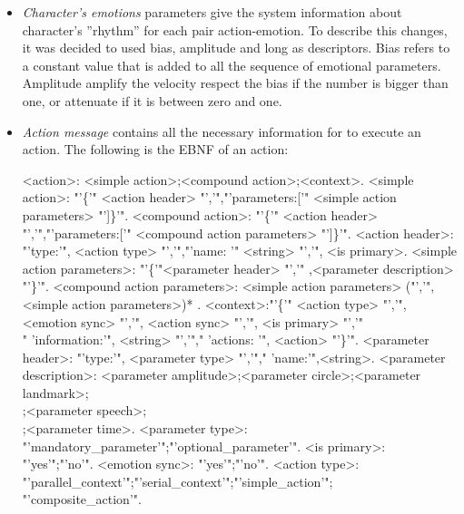 \begin{itemize}
	\item \textit{Character's emotions} parameters give the system information about character's ''rhythm'' for each pair action-emotion. To describe this changes, it was decided to used bias, amplitude and long as descriptors. Bias refers to a constant value that is added to all the sequence of emotional parameters. Amplitude amplify the velocity respect the bias if the number is bigger than one, or attenuate if it is between zero and one. 


	\item \textit{Action message} contains all the necessary information for to execute an action. The following is the EBNF of an action:
\begin{grammar}
<action>: <simple action>;<compound action>;<context>.
<simple action>: "'\{'" <action header> "','","'parameters:['" <simple action parameters> "']\}'".
<compound action>: "'\{'" <action header> "','","'parameters:['" <compound action parameters> "']\}'".
<action header>: "'type:'", <action type> "','","'name: '" <string>  "','", <is primary>.
<simple action parameters>: "'\{'"<parameter header> "','" ,<parameter description> "'\}'". 
<compound action parameters>:  <simple action parameters> ("','", <simple action parameters>)* .
<context>:"'\{'" <action type> "','", <emotion sync> "','", <action sync> "','", <is primary> "','"\\" 'information:'", <string> "','"," 'actions: '", <action> "'\}'".
<parameter header>: "'type:'", <parameter type> "','"," 'name:'",<string>.
<parameter description>: <parameter amplitude>;<parameter circle>;<parameter landmark>;\\<parameter point>;<parameter speech>;\\<parameter square>;<parameter time>.
<parameter type>: "'mandatory\_parameter'";"'optional\_parameter'". 
<is primary>: "'yes'";"'no'".
<emotion sync>: "'yes'";"'no'".
<action type>: "'parallel\_context'";"'serial\_context'";"'simple\_action'";\\"'composite\_action'".
\end{grammar}
\end{itemize} 